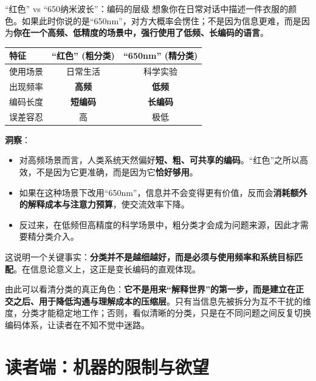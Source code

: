 \documentclass[11pt, a4paper]{ctexart}
\begin{document}
	\begin{thinkbox}{“红色” vs “650纳米波长”：编码的层级}
		想象你在日常对话中描述一件衣服的颜色。如果此时你说的是“650nm”，对方大概率会愣住；不是因为信息更难，而是因为\textbf{你在一个高频、低精度的场景中，强行使用了低频、长编码的语言}。
		
		\begin{center}
			\begin{tabular}{l|c|c}
				\toprule
				\textbf{特征} & \textbf{“红色” (粗分类)} & \textbf{“650nm” (精分类)} \\
				\midrule
				使用场景 & 日常生活 & 科学实验 \\
				出现频率 & \textbf{高频} & \textbf{低频} \\
				编码长度 & \textbf{短编码} & \textbf{长编码} \\
				误差容忍 & 高 & 极低 \\
				\bottomrule
			\end{tabular}
		\end{center}
		
		\textbf{洞察}：
		\begin{itemize}
			\item 对高频场景而言，人类系统天然偏好\textbf{短、粗、可共享的编码}。“红色”之所以高效，不是因为它更准确，而是因为它\textbf{恰好够用}。
			\item 如果在这种场景下改用“650nm”，信息并不会变得更有价值，反而会\textbf{消耗额外的解释成本与注意力预算}，使交流效率下降。
			\item 反过来，在低频但高精度的科学场景中，粗分类才会成为问题来源，因此才需要精分类介入。
		\end{itemize}
		这说明一个关键事实：\textbf{分类并不是越细越好，而是必须与使用频率和系统目标匹配}。在信息论意义上，这正是变长编码的直观体现。
	\end{thinkbox}
	
	由此可以看清分类的真正角色：\textbf{它不是用来“解释世界”的第一步，而是建立在正交之后、用于降低沟通与理解成本的压缩层}。只有当信息先被拆分为互不干扰的维度，分类才能稳定地工作；否则，看似清晰的分类，只是在不同问题之间反复切换编码体系，让读者在不知不觉中迷路。
	
	
	
	\newpage
	\section{ 读者端：机器的限制与欲望}
	
\end{document}
